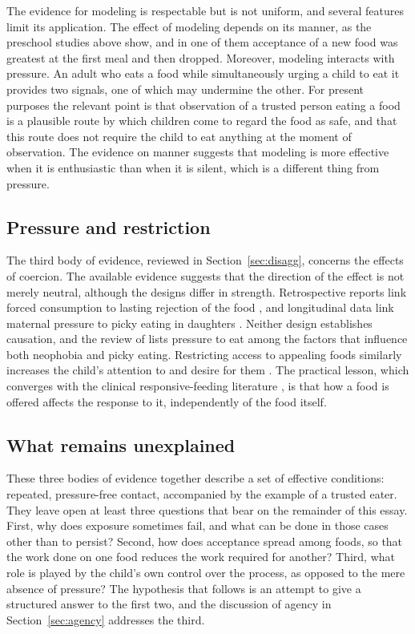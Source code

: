 \documentclass[11pt]{article}
\theoremstyle{remark}
\begin{document}
The evidence for modeling is respectable but is not uniform, and several features limit its application. The effect of modeling depends on its manner, as the preschool studies above show, and in one of them acceptance of a new food was greatest at the first meal and then dropped. Moreover, modeling interacts with pressure. An adult who eats a food while simultaneously urging a child to eat it provides two signals, one of which may undermine the other. For present purposes the relevant point is that observation of a trusted person eating a food is a plausible route by which children come to regard the food as safe, and that this route does not require the child to eat anything at the moment of observation. The evidence on manner suggests that modeling is more effective when it is enthusiastic than when it is silent, which is a different thing from pressure.

\subsection{Pressure and restriction}

The third body of evidence, reviewed in Section~\ref{sec:disagg}, concerns the effects of coercion. The available evidence suggests that the direction of the effect is not merely neutral, although the designs differ in strength. Retrospective reports link forced consumption to lasting rejection of the food \citep{batsell2002you}, and longitudinal data link maternal pressure to picky eating in daughters \citep{galloway2005parental}. Neither design establishes causation, and the review of \citet{dovey2008food} lists pressure to eat among the factors that influence both neophobia and picky eating. Restricting access to appealing foods similarly increases the child's attention to and desire for them \citep{fisher1999restricting}. The practical lesson, which converges with the clinical responsive-feeding literature \citep{black2011responsive}, is that how a food is offered affects the response to it, independently of the food itself.

\subsection{What remains unexplained}

These three bodies of evidence together describe a set of effective conditions: repeated, pressure-free contact, accompanied by the example of a trusted eater. They leave open at least three questions that bear on the remainder of this essay. First, why does exposure sometimes fail, and what can be done in those cases other than to persist? Second, how does acceptance spread among foods, so that the work done on one food reduces the work required for another? Third, what role is played by the child's own control over the process, as opposed to the mere absence of pressure? The hypothesis that follows is an attempt to give a structured answer to the first two, and the discussion of agency in Section~\ref{sec:agency} addresses the third.
\end{document}
